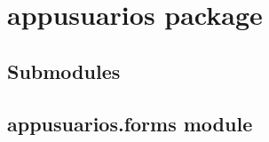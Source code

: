 \documentclass[letterpaper,10pt,spanish]{sphinxmanual}
\begin{document}
\chapter{appusuarios package}
\label{\detokenize{modules/appusuarios:appusuarios-package}}\label{\detokenize{modules/appusuarios::doc}}

\section{Submodules}
\label{\detokenize{modules/appusuarios:submodules}}

\section{appusuarios.forms module}
\label{\detokenize{modules/appusuarios:module-appusuarios.forms}}\label{\detokenize{modules/appusuarios:appusuarios-forms-module}}
\end{document}
